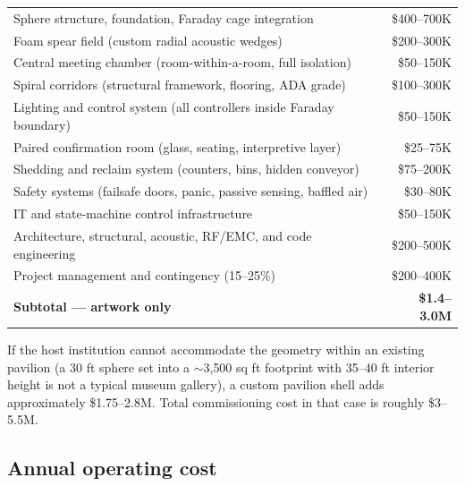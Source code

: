 \documentclass[]{anvil-installation}
\begin{document}
\begin{metricbox}
\begin{tabularx}{\textwidth}{@{} X r @{}}
Sphere structure, foundation, Faraday cage integration & \$400--700K \\
Foam spear field (custom radial acoustic wedges) & \$200--300K \\
Central meeting chamber (room-within-a-room, full isolation) & \$50--150K \\
Spiral corridors (structural framework, flooring, ADA grade) & \$100--300K \\
Lighting and control system (all controllers inside Faraday boundary) & \$50--150K \\
Paired confirmation room (glass, seating, interpretive layer) & \$25--75K \\
Shedding and reclaim system (counters, bins, hidden conveyor) & \$75--200K \\
Safety systems (failsafe doors, panic, passive sensing, baffled air) & \$30--80K \\
IT and state-machine control infrastructure & \$50--150K \\
Architecture, structural, acoustic, RF/EMC, and code engineering & \$200--500K \\
Project management and contingency (15--25\%) & \$200--400K \\
\midrule
\textbf{Subtotal --- artwork only} & \textbf{\$1.4--3.0M} \\
\end{tabularx}
\end{metricbox}

If the host institution cannot accommodate the geometry within an existing pavilion (a 30 ft sphere set into a $\sim$3{,}500 sq ft footprint with 35--40 ft interior height is not a typical museum gallery), a custom pavilion shell adds approximately \$1.75--2.8M. Total commissioning cost in that case is roughly \$3--5.5M.

\subsection{Annual operating cost}
\end{document}
